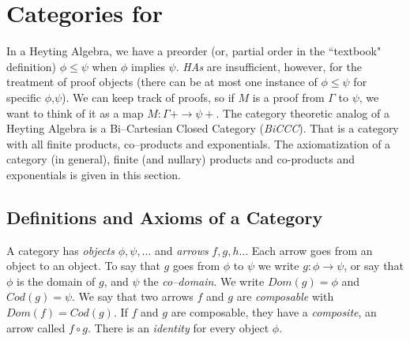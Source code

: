 \section{Categories for }

In a Heyting Algebra, we have a preorder (or, partial order in the ``textbook" definition) $\phi\leq \psi$ when $\phi$ implies $\psi$. \emph{HAs} are insufficient, however, for the treatment of proof objects (there can be at most one instance of $\phi\leq\psi$ for specific $\phi$,$\psi$). We can  keep track of proofs, so if $M$ is a proof from  $\Gamma$ to $\psi$, we want to think of it as a map $M:\Gamma+\to \psi+$. The category theoretic analog of a Heyting 	Algebra is a Bi--Cartesian Closed Category (\emph{BiCCC}). That is a category with all finite products, co--products and exponentials. The axiomatization of a category (in general), finite (and nullary) products and co-products and exponentials is given in this section. 

\subsection{Definitions and Axioms of a Category}
A category has \emph{objects} $\phi,\psi, \ldots$ and \emph{arrows} $f,g,h\ldots$ Each arrow goes from an object to an object. To say that $g$ goes from $\phi$ to $\psi$ we write $g:\phi\rightarrow\psi$, or say that $\phi$ is the domain of $g$, and $\psi$ the \emph{co--domain}. We write $Dom(g)=\phi$ and $Cod(g)=\psi$.
We say that two arrows $f$ and $g$ are \emph{composable} with $Dom(f)=Cod(g)$. If $f$ and $g$ are composable, they have a \emph{composite}, an arrow called $f\circ g$. There is an \emph{identity} for every object $\phi$.
\begin{mdframed}
\end{mdframed}




